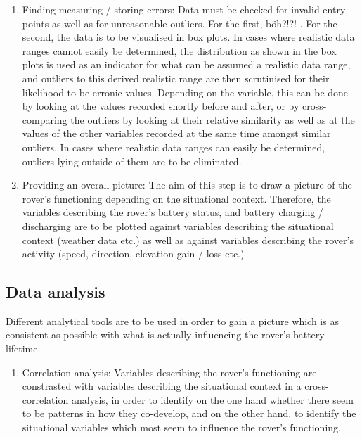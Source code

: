 \documentclass[11pt, UKenglish]{report}
\begin{document}
{\begin{enumerate}
	\item{\large{Finding measuring / storing errors:} \normalsize Data must be checked for invalid entry points as well as for unreasonable outliers. For the first, böh?!?! . For the second, the data is to be visualised in box plots. In cases where realistic data ranges cannot easily be determined, the distribution as shown in the box plots is used as an indicator for what can be assumed a realistic data range, and outliers to this derived realistic range are then scrutinised for their likelihood to be erronic values. Depending on the variable, this can be done by looking at the values recorded shortly before and after, or by cross-comparing the outliers by looking at their relative similarity as well as at the values of the other variables recorded at the same time amongst similar outliers. In cases where realistic data ranges can easily be determined, outliers lying outside of them are to be eliminated.}

	\item{\large{Providing an overall picture:} \normalsize The aim of this step is to draw a picture of the rover's functioning depending on the situational context. Therefore, the variables describing the rover's battery status, and battery charging / discharging are to be plotted against variables describing the situational context (weather data etc.) as well as against variables describing the rover's activity (speed, direction, elevation gain / loss etc.)}

\end{enumerate}

\subsection*{Data analysis}

Different analytical tools are to be used in order to gain a picture which is as consistent as possible with what is actually influencing the rover's battery lifetime. 

\begin{enumerate}

	\item{\large{Correlation analysis:} \normalsize Variables describing the rover's functioning are constrasted with variables describing the situational context in a cross-correlation analysis, in order to identify on the one hand whether there seem to be patterns in how they co-develop, and on the other hand, to identify the situational variables which most seem to influence the rover's functioning.}


\end{enumerate}}
\end{document}
